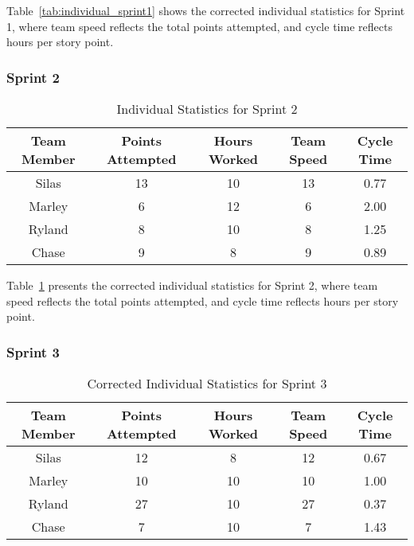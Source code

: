 Table~\ref{tab:individual_sprint1} shows the corrected individual statistics for Sprint 1, where team speed reflects the total points attempted, and cycle time reflects hours per story point.


\subsubsection{Sprint 2}
\begin{table}[H]
    \centering
    \begin{tabular}{|c|c|c|c|c|}
    \hline
    \textbf{Team Member} & \textbf{Points Attempted} & \textbf{Hours Worked} & \textbf{Team Speed} & \textbf{Cycle Time} \\ \hline
    Silas & 13 & 10 & 13 & 0.77 \\ \hline
    Marley & 6 & 12 & 6 & 2.00 \\ \hline
    Ryland & 8 & 10 & 8 & 1.25 \\ \hline
    Chase & 9 & 8 & 9 & 0.89 \\ \hline
    \end{tabular}
    \caption{Individual Statistics for Sprint 2}
    \label{tab:individual_sprint2}
\end{table}

Table~\ref{tab:individual_sprint2} presents the corrected individual statistics for Sprint 2, where team speed reflects the total points attempted, and cycle time reflects hours per story point.


\subsubsection{Sprint 3}
\begin{table}[H]
    \centering
    \begin{tabular}{|c|c|c|c|c|}
    \hline
    \textbf{Team Member} & \textbf{Points Attempted} & \textbf{Hours Worked} & \textbf{Team Speed} & \textbf{Cycle Time} \\ \hline
    Silas & 12 & 8 & 12 & 0.67 \\ \hline
    Marley & 10 & 10 & 10 & 1.00 \\ \hline
    Ryland & 27 & 10 & 27 & 0.37 \\ \hline
    Chase & 7 & 10 & 7 & 1.43 \\ \hline
    \end{tabular}
    \caption{Corrected Individual Statistics for Sprint 3}
    \label{tab:individual_sprint3}
\end{table}

